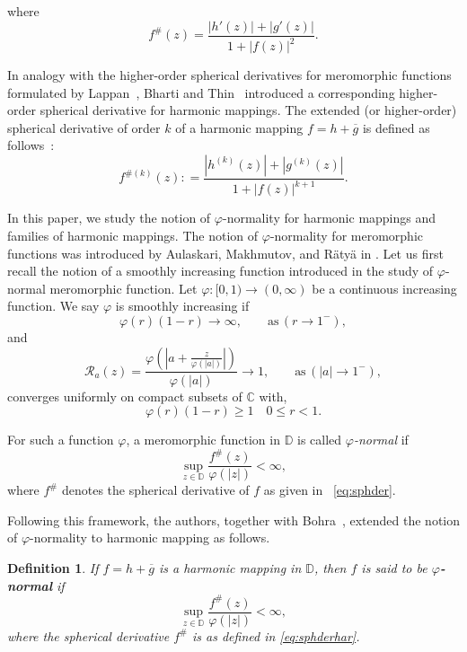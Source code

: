 \documentclass[10pt,a4paper]{amsart}
\numberwithin{equation}{section}
\newtheorem{definition}{Definition}[section]
\begin{document}
where
  \begin{equation}\label{eq:sphderhar}
    f^\#(z)=\frac{|h'(z)|+|g'(z)|}{1+|f(z)|^2}.
  \end{equation}

In analogy with the higher-order spherical derivatives for 
meromorphic functions formulated by Lappan~\cite{Lappan1977}, Bharti 
and Thin~\cite{bharatithin} introduced a corresponding
higher-order spherical derivative for harmonic mappings.
The extended (or higher-order) spherical derivative of order $k$ 
 of a harmonic mapping $f=h+\overline{g}$  is defined as follows~\cite[p. 389]{bharatithin}: 
\begin{equation}\label{eq:Ksphderhar}
    f^{\#(k)}(z): =\frac{|h^{(k)}(z)|+|g^{(k)}(z)|}{1+|f(z)|^{k+1}}.
  \end{equation}


In this paper, we study the notion of $\varphi$-normality for harmonic mappings and 
families of harmonic mappings. The notion of  $\varphi$-normality for meromorphic 
functions was introduced by Aulaskari, Makhmutov, and R\"aty\"a in \cite{Aulaskari}. 
Let us first recall the notion of a smoothly increasing function introduced in the study of
 $\varphi$-normal meromorphic function. Let $\varphi:[0,1)\to (0,\infty)$ be a 
continuous increasing function. We say $\varphi$ is smoothly increasing if
\[
\varphi(r)(1-r)\rightarrow \infty,\qquad \text{as}\,  (r\to1^-),
\] 
and
\[
\mathcal{R}_a(z)=\frac{\varphi\left(\left|a+\frac{z}{\varphi(|a|)}
\right|\right)}{\varphi(|a|)}\rightarrow 1, \qquad \text{as}\, 
(|a|\to 1^-),
\]
converges uniformly on compact subsets of $\mathbb{C}$ with,
 \[
\varphi(r)(1-r)\geq1 \quad 0\leq r <1.
\]

For such a function $\varphi$, a meromorphic 
  function in $\mathbb{D}$ is called {\it $\varphi$-normal} if
  \[
  \sup_{z\in\mathbb{D}}\frac{f^\#(z)}{\varphi(|z|)}<\infty,
  \]
  where $f^\#$ denotes the spherical derivative of $f$ as given in ~\eqref{eq:sphder}.
  \smallskip
  
  Following this framework, the authors, together with Bohra~\cite{Bohra},
  extended the notion of 
  $\varphi$-normality to harmonic mapping as follows.
\begin{definition}\cite[Definition 1.2]{Bohra}
    If $f=h+\overline{g}$ is
    a harmonic mapping in $\mathbb{D}$,
      then $f$ is said to be
   {\bf $\varphi$-normal} if
  \[
  \sup_{z\in\mathbb{D}}\frac{f^\#(z)}{\varphi(|z|)}<\infty,
  \]
  where the spherical derivative $f^\#$ is as defined in \eqref{eq:sphderhar}.

\end{definition}
\end{document}
